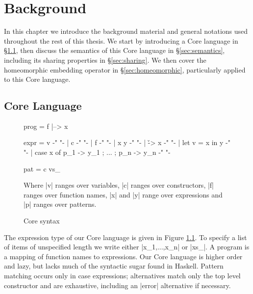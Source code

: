 
\chapter{Background}
\label{chp:background}

In this chapter we introduce the background material and general notations used throughout the rest of this thesis. We start by introducing a Core language in \S\ref{sec:core}, then discuss the semantics of this Core language in \S\ref{sec:semantics}, including its sharing properties in \S\ref{sec:sharing}. We then cover the homeomorphic embedding operator in \S\ref{sec:homeomorphic}, particularly applied to this Core language.

\section{Core Language}
\label{sec:core}

\begin{figure}
\begin{code}
prog  =  f |--> x

expr  =  v                                          {-"  "-}
      |  c                                          {-"  "-}
      |  f                                          {-"  "-}
      |  x y                                        {-"  "-}
      |  \v -> x                                    {-"  "-}
      |  let v = x in y                             {-"  "-}
      |  case x of {p_1 -> y_1 ; ... ; p_n -> y_n}  {-"  "-}

pat   =  c vs_
\end{code}

Where |v| ranges over variables, |c| ranges over constructors, |f| ranges over function names, |x| and |y| range over expressions and |p| ranges over patterns.
\caption{Core syntax}
\label{fig:core}
\end{figure}

The expression type of our Core language is given in Figure \ref{fig:core}. To specify a list of items of unspecified length we write either |x_1,...,x_n| or |xs_|. A program is a mapping of function names to expressions. Our Core language is higher order and lazy, but lacks much of the syntactic sugar found in Haskell. Pattern matching occurs only in case expressions; alternatives match only the top level constructor and are exhaustive, including an |error| alternative if necessary.

